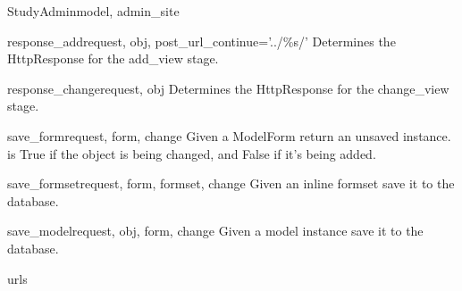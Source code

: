 \documentclass[letterpaper,10pt,english]{sphinxmanual}
\begin{document}
\begin{classdesc}{StudyAdmin}{model, admin\_site}
\hypertarget{data.admin.StudyAdmin.response_add}{}\begin{methoddesc}{response\_add}{request, obj, post\_url\_continue='../\%s/'}
Determines the HttpResponse for the add\_view stage.
\end{methoddesc}

\hypertarget{data.admin.StudyAdmin.response_change}{}\begin{methoddesc}{response\_change}{request, obj}
Determines the HttpResponse for the change\_view stage.
\end{methoddesc}

\hypertarget{data.admin.StudyAdmin.save_form}{}\begin{methoddesc}{save\_form}{request, form, change}
Given a ModelForm return an unsaved instance.  is True if
the object is being changed, and False if it's being added.
\end{methoddesc}

\hypertarget{data.admin.StudyAdmin.save_formset}{}\begin{methoddesc}{save\_formset}{request, form, formset, change}
Given an inline formset save it to the database.
\end{methoddesc}

\hypertarget{data.admin.StudyAdmin.save_model}{}\begin{methoddesc}{save\_model}{request, obj, form, change}
Given a model instance save it to the database.
\end{methoddesc}

\hypertarget{data.admin.StudyAdmin.urls}{}\begin{memberdesc}{urls}\end{memberdesc}
\end{classdesc}
\end{document}
